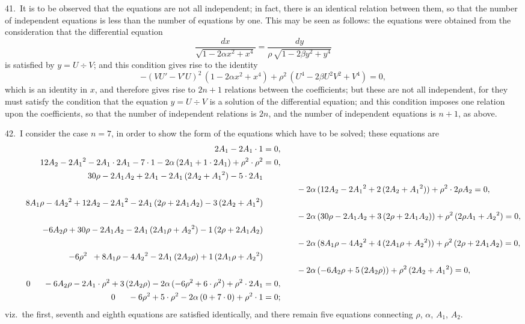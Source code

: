 \documentclass[11pt,a4paper]{book}
\begin{document}
41.\ It is to be observed that the equations are not all independent; in fact, there
is an identical relation between them, so that the number of independent equations is
less than the number of equations by one. This may be seen as follows: the equations
were obtained from the consideration that the differential equation
\[
\frac{dx}{\sqrt{1 - 2\alpha x^2 + x^4}}
= \frac{dy}{\rho\, \sqrt{1 - 2\beta y^2 + y^4}}
\]
is satisfied by $y = U \div V$; and this condition gives rise to the identity
\[
-(VU' - V'U)^2\, (1 - 2\alpha x^2 + x^4)
+ \rho^2\, (U^4 - 2\beta U^2 V^2 + V^4) = 0,
\]
which is an identity in $x$, and therefore gives rise to $2n + 1$ relations between the
coefficients; but these are not all independent, for they must satisfy the condition that
the equation $y = U \div V$ is a solution of the differential equation; and this condition
imposes one relation upon the coefficients, so that the number of independent relations
is $2n$, and the number of independent equations is $n + 1$, as above.

42.\ I consider the case $n = 7$, in order to show the form of the equations which
have to be solved; these equations are
\begin{align*}
\makebox[3em][r]{$2A_1$} - 2A_1 \cdot 1 &= 0,\\
\makebox[3em][r]{$12A_2$} - 2A_1{}^2 - 2A_1 \cdot 2A_1 - 7 \cdot 1
- 2\alpha\, (2A_1 + 1 \cdot 2A_1) + \rho^2 \cdot \rho^2 &= 0,\\
\makebox[3em][r]{$30\rho$} - 2A_1 A_2 + 2A_1 - 2A_1\, (2A_2 + A_1{}^2) - 5 \cdot 2A_1 \\
&\qquad\qquad - 2\alpha\, (12A_2 - 2A_1{}^2 + 2\, (2A_2 + A_1{}^2)) + \rho^2 \cdot 2\rho A_2 = 0,\\
\makebox[3em][r]{$8A_1\rho$} - 4A_2{}^2 + 12A_2 - 2A_1{}^2 - 2A_1\, (2\rho + 2A_1 A_2) - 3\, (2A_2 + A_1{}^2) \\
&\qquad\qquad - 2\alpha\, (30\rho - 2A_1 A_2 + 3\, (2\rho + 2A_1 A_2)) + \rho^2\, (2\rho A_1 + A_2{}^2) = 0,\\
-6A_2\rho + 30\rho - 2A_1 A_2 - 2A_1\, (2A_1\rho + A_2{}^2) - 1\, (2\rho + 2A_1 A_2) \\
&\qquad\qquad - 2\alpha\, (8A_1\rho - 4A_2{}^2 + 4\, (2A_1\rho + A_2{}^2)) + \rho^2\, (2\rho + 2A_1 A_2) = 0,\\
-6\rho^2 \;\; + 8A_1\rho - 4A_2{}^2 - 2A_1\, (2A_2\rho) + 1\, (2A_1\rho + A_2{}^2) \\
&\qquad\qquad - 2\alpha\, (-6A_2\rho + 5\, (2A_2\rho)) + \rho^2\, (2A_2 + A_1{}^2) = 0,\\
\makebox[3em][r]{$0$} \quad\;\; - 6A_2\rho - 2A_1 \cdot \rho^2 + 3\, (2A_2\rho)
- 2\alpha\, (-6\rho^2 + 6 \cdot \rho^2) + \rho^2 \cdot 2A_1 &= 0,\\
\makebox[3em][r]{$0$} \quad\;\; - 6\rho^2 + 5 \cdot \rho^2 - 2\alpha\, (0 + 7 \cdot 0) + \rho^2 \cdot 1 &= 0;
\end{align*}
viz.\ the first, seventh and eighth equations are satisfied identically, and there remain
five equations connecting $\rho$, $\alpha$, $A_1$, $A_2$.
\end{document}
